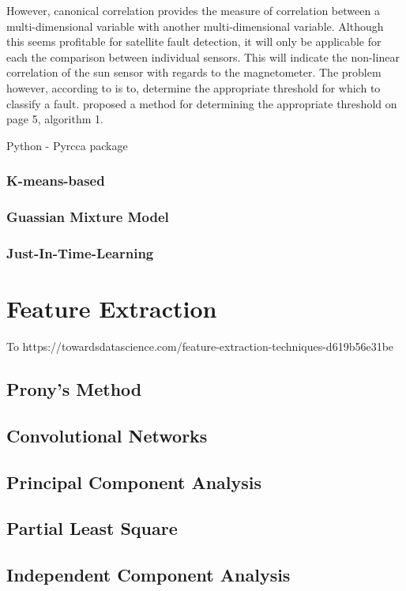 However, canonical correlation provides the measure of correlation between a multi-dimensional variable with another multi-dimensional variable. Although this seems profitable for satellite fault detection, it will only be applicable for each the comparison between individual sensors. This will indicate the non-linear correlation of the sun sensor with regards to the magnetometer. The problem however, according to \textcite{chen2017fault} is to, determine the appropriate threshold for which to classify a fault. \textcite{chen2017fault} proposed a method for determining the appropriate threshold on page 5, algorithm 1.
\cite{fukumizu2007statistical}
\cite{zhu2017quality}

Python - Pyrcca package

\subsubsection{K-means-based}
\subsubsection{Guassian Mixture Model}
\subsubsection{Just-In-Time-Learning}
\cite{chen2020just}

\section{Feature Extraction}
To 
https://towardsdatascience.com/feature-extraction-techniques-d619b56e31be
\subsection{Prony's Method}
\subsection{Convolutional Networks}
\subsection{Principal Component Analysis}
\cite{choi2005fault}
\cite{ding2010application}
\subsection{Partial Least Square}
\subsection{Independent Component Analysis}
